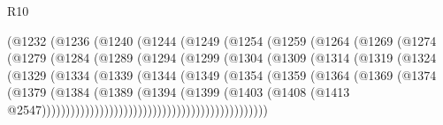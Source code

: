 \begin{lexlean}{R10}
\begin{coremodule}
                      (@1232
                        (@1236
                          (@1240
                            (@1244
                              (@1249
                                (@1254
                                  (@1259
                                    (@1264
                                      (@1269
                                        (@1274
                                          (@1279
                                            (@1284
                                              (@1289
                                                (@1294
                                                  (@1299
                                                    (@1304
                                                      (@1309
                                                        (@1314
                                                          (@1319
                                                            (@1324
                                                              (@1329
                                                                (@1334
                                                                  (@1339
                                                                    (@1344
                                                                      (@1349
                                                                        (@1354
                                                                          (@1359
                                                                            (@1364
                                                                              (@1369
                                                                                (@1374
                                                                                  (@1379
                                                                                    (@1384
                                                                                      (@1389
                                                                                        (@1394
                                                                                          (@1399
                                                                                            (@1403
                                                                                              (@1408
                                                                                                (@1413
                                                                                                  @2547)))))))))))))))))))))))))))))))))))))))))))))))

\end{coremodule}
\end{lexlean}

